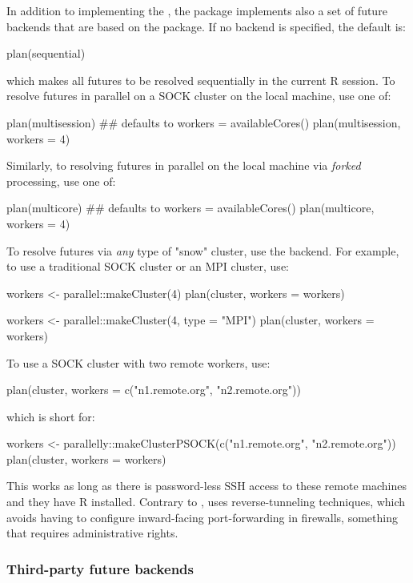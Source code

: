 In addition to implementing the , the  package
implements also a set of future backends that are based on
the  package.  If no backend is specified, the default
is:
\begin{example}
plan(sequential)
\end{example}
which makes all futures to be resolved sequentially in the current R
session.
%
To resolve futures in parallel on a SOCK cluster on the local machine,
use one of:
\begin{example}
plan(multisession) ## defaults to workers = availableCores()
plan(multisession, workers = 4)
\end{example}
%
Similarly, to resolving futures in parallel on the local machine via
\emph{forked} processing, use one of:
\begin{example}
plan(multicore) ## defaults to workers = availableCores()
plan(multicore, workers = 4)
\end{example}
%
To resolve futures via \emph{any} type of "snow" cluster, use
the  backend.  For example, to use a traditional SOCK
cluster or an MPI cluster, use:
\begin{example}
workers <- parallel::makeCluster(4)
plan(cluster, workers = workers)

workers <- parallel::makeCluster(4, type = "MPI")
plan(cluster, workers = workers)
\end{example}
To use a SOCK cluster with two remote workers, use:
\begin{example}
plan(cluster, workers = c("n1.remote.org", "n2.remote.org"))
\end{example}
which is short for:
\begin{example}
workers <- parallelly::makeClusterPSOCK(c("n1.remote.org", "n2.remote.org"))
plan(cluster, workers = workers)
\end{example}
This works as long as there is password-less SSH access to these
remote machines and they have R installed.  Contrary to
,
 uses reverse-tunneling
techniques, which avoids having to configure inward-facing
port-forwarding in firewalls, something that requires administrative
rights.


\subsubsection{Third-party future backends}

